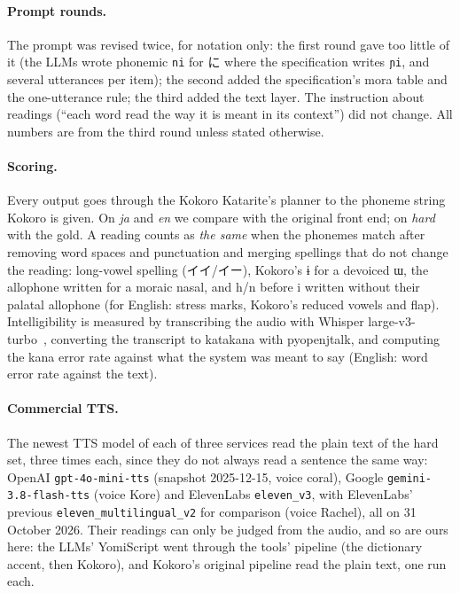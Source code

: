\documentclass[11pt,a4paper]{article}
\newcommand{\ys}[1]{\mbox{\texttt{#1}}}
\begin{document}
\paragraph{Prompt rounds.} The prompt was revised twice, for notation only: the first round gave too little of it (the
LLMs wrote phonemic \ys{ni} for に where the specification writes \ys{ɲi}, and several utterances per item); the second
added the specification's mora table and the one-utterance rule; the third added the text layer. The instruction about
readings (``each word read the way it is meant in its context'') did not change. All numbers are from the third round
unless stated otherwise.

\paragraph{Scoring.} Every output goes through the Kokoro Katarite's planner to the phoneme string Kokoro is given. On
\emph{ja} and \emph{en} we compare with the original front end; on \emph{hard} with the gold. A reading counts as
\emph{the same} when the phonemes match after removing word spaces and punctuation and merging spellings that do not
change the reading: long-vowel spelling (イイ/イー), Kokoro's ɨ for a devoiced ɯ, the allophone written for a moraic
nasal, and h/n before i written without their palatal allophone (for English: stress marks, Kokoro's reduced vowels and
flap). Intelligibility is measured by transcribing the audio with Whisper large-v3-turbo~\citep{radford2023whisper},
converting the transcript to katakana with pyopenjtalk, and computing the kana error rate against what the system was
meant to say (English: word error rate against the text).

\paragraph{Commercial TTS.} The newest TTS model of each of three services read the plain text of the hard set, three
times each, since they do not always read a sentence the same way: OpenAI \texttt{gpt-4o-mini-tts} (snapshot
2025-12-15, voice coral), Google \texttt{gemini-3.8-flash-tts} (voice Kore) and ElevenLabs \texttt{eleven\_v3}, with
ElevenLabs' previous \texttt{eleven\_multilingual\_v2} for comparison (voice Rachel), all on 31 October 2026. Their
readings can only be judged from the audio, and so are ours here: the LLMs' YomiScript went through the tools' pipeline
(the dictionary accent, then Kokoro), and Kokoro's original pipeline read the plain text, one run each.
\end{document}
